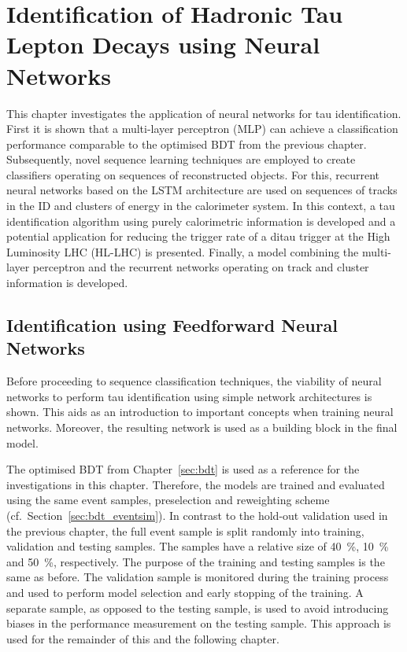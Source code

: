\chapter{Identification of Hadronic Tau Lepton Decays using Neural Networks}
\label{sec:rnn}

This chapter investigates the application of neural networks for tau
identification. First it is shown that a multi-layer perceptron (MLP) can
achieve a classification performance comparable to the optimised BDT from the
previous chapter. Subsequently, novel sequence learning techniques are employed
to create classifiers operating on sequences of reconstructed objects. For this,
recurrent neural networks based on the LSTM architecture are used on sequences
of tracks in the ID and clusters of energy in the calorimeter system. In this
context, a tau identification algorithm using purely calorimetric information is
developed and a potential application for reducing the trigger rate of a ditau
trigger at the High Luminosity LHC (HL-LHC) is presented. Finally, a model
combining the multi-layer perceptron and the recurrent networks operating on
track and cluster information is developed.

\section{Identification using Feedforward Neural Networks}
\label{sec:ffnn_id}

Before proceeding to sequence classification techniques, the viability of neural
networks to perform tau identification using simple network architectures is
shown. This aids as an introduction to important concepts when training neural
networks. Moreover, the resulting network is used as a building block in the
final model.

The optimised BDT from Chapter~\ref{sec:bdt} is used as a reference for the
investigations in this chapter. Therefore, the models are trained and evaluated
using the same event samples, preselection and reweighting scheme (cf.\
Section~\ref{sec:bdt_eventsim}). In contrast to the hold-out validation used in
the previous chapter, the full event sample is split randomly into training,
validation and testing samples. The samples have a relative size of
\SI{40}{\percent}, \SI{10}{\percent} and \SI{50}{\percent}, respectively. The
purpose of the training and testing samples is the same as before. The
validation sample is monitored during the training process and used to perform
model selection and early stopping of the training. A separate sample, as
opposed to the testing sample, is used to avoid introducing biases in the
performance measurement on the testing sample. This approach is used for the
remainder of this and the following chapter.

